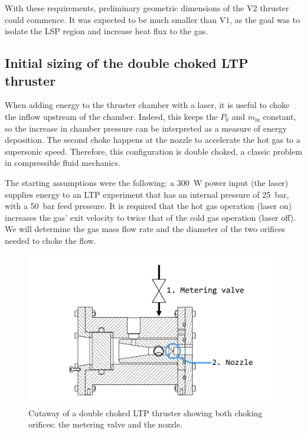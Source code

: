             With these requirements, preliminary geometric dimensions of the V2 thruster could commence. It was expected to be much smaller than V1, as the goal was to isolate the LSP region and increase heat flux to the gas.

        \subsection{Initial sizing of the double choked LTP thruster}

            When adding energy to the thruster chamber with a laser, it is useful to choke the inflow upstream of the chamber. Indeed, this keeps the $P_0$ and $\dot{m}_\mathrm{in}$ constant, so the increase in chamber pressure can be interpreted as a measure of energy deposition. The second choke happens at the nozzle to accelerate the hot gas to a supersonic speed. Therefore, this configuration is double choked, a classic problem in compressible fluid mechanics.
            
            The starting assumptions were the following: a \qty{300}{W} power input (the laser) supplies energy to an LTP experiment that has an internal pressure of \qty{25}{bar}, with a \qty{50}{bar} feed pressure. It is required that the hot gas operation (laser on) increases the gas' exit velocity to twice that of the cold gas operation (laser off). We will determine the gas mass flow rate and the diameter of the two orifices needed to choke the flow.

            \begin{figure}[h]
                \centering
                \includegraphics[width=0.8\linewidth]{assets/3 design/Double choked LTP thruster.pdf}
                \caption{Cutaway of a double choked LTP thruster showing both choking orifices: the metering valve and the nozzle.}
                \label{fig:double choke sizing}
            \end{figure}
            
